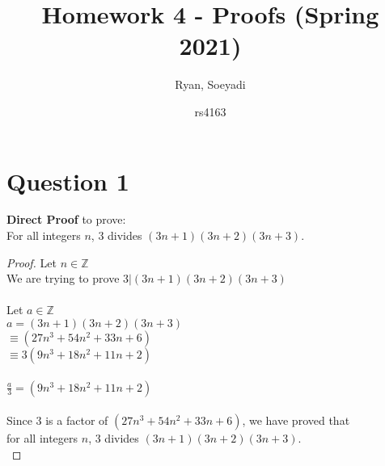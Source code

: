 \documentclass{article}
\title{Homework 4 - Proofs (Spring 2021)}
\author
{
Ryan, Soeyadi
\and rs4163
}
\begin{document}
    \maketitle
    
    \section*{Question 1}
    \textbf{Direct Proof} to prove: \\
    \indent For all integers $n$, $3$ divides $(3n + 1)(3n + 2)(3n + 3)$. 
    \begin{proof} Let $n \in \mathbb{Z}$ \\
    We are trying to prove $3 | (3n + 1)(3n + 2)(3n + 3)$ \\ \\
    Let $a \in \mathbb{Z}$ \\
    $a = (3n + 1)(3n + 2)(3n + 3)$ \\
    $\equiv (27n^3 + 54n^2 + 33n + 6)$ \\
    $\equiv 3(9n^3 + 18n^2 + 11n + 2)$ \\ \\
    $\frac{a}{3} = (9n^3 + 18n^2 + 11n + 2)$ \\ \\
    Since $3$ is a factor of $(27n^3 + 54n^2 + 33n + 6)$, we have proved that \\ for all integers $n$, $3$ divides $(3n + 1)(3n + 2)(3n + 3)$. \\ \end{proof}

    \newpage
\end{document}
